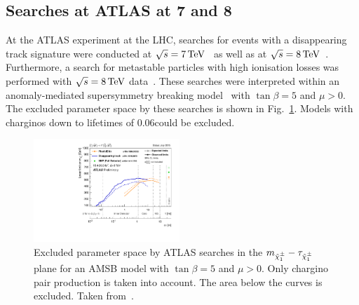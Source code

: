 \subsection*{Searches at ATLAS at 7 and 8\tev}
At the ATLAS experiment at the LHC, searches for events with a disappearing track signature were conducted at $\sqrt{s}=7\,\text{Te}\kern-0.06667em\text{V}$~\cite{bib:PreviousSearches_Atlas_DT_7TeV} as well as at $\sqrt{s}=8\,\text{Te}\kern-0.06667em\text{V}$~\cite{bib:PreviousSearches_Atlas_DT_8TeV}. 
Furthermore, a search for metastable particles with high ionisation losses was performed with $\sqrt{s}=8\,\text{Te}\kern-0.06667em\text{V}$ data~\cite{bib:PreviousSearches_ATLAS_DEDX}.
These searches were interpreted within an anomaly-mediated supersymmetry breaking model~\cite{bib:Theory_AMSB_1998} with $\tan\beta=5$ and $\mu>0$.
The excluded parameter space by these searches is shown in Fig.~\ref{fig:ATLAS}.
Models with charginos down to lifetimes of 0.06\ns could be excluded.
\begin{figure}[!h]
  \centering
      \includegraphics[width=0.49\textwidth]{figures/theory/ATLAS_SUSY_LLPChargino.pdf}
  \caption{Excluded parameter space by ATLAS searches in the $m_{\tilde{\chi}^{\pm}_{1}}-\tau_{\tilde{\chi}^{\pm}_{1}}$ plane for an AMSB model with $\tan\beta=5$ and $\mu>0$. Only chargino pair production is taken into account. The area below the curves is excluded. Taken from~\cite{bib:ATLAS_SUMMARYPLOTS}.}  
  \label{fig:ATLAS}
\end{figure}

